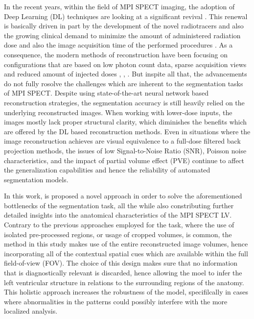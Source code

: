 In the recent years, within the field of MPI SPECT imaging, the adoption of Deep Learning (DL) techniques are looking at a significant revival \cite{tolu2025advancements}. This renewal is basically driven in part by the development of the novel radiotracers and also the growing clinical demand to minimize the amount of administered radiation dose and also the image acquisition time of the performed procedures \cite{henzlova2011future}. As a consequence, the modern methods of reconstruction have been focusing on configurations that are based on low photon count data, sparse acquisition views and reduced amount of injected doses \cite{xie2023transformer}, \cite{xie2024generalizable}, \cite{chen2024dudocfnet}. But inspite all that, the advancements do not fully rosolve the challenges which are inherent to  the segmentation tasks of MPI SPECT. Despite using state-of-the-art neural network based reconstruction strategies, the segmentation accuracy is still heavily relied on the underlying reconstructed images. When working with lower-dose inputs, the images mostly lack proper structural clarity, which diminishes the benefits which are offered by the DL based reconstruction methods. Even in situations where the image reconstruction achieves are visual equivalence to a full-dose filtered back projection methods, the issues of low Signal-to-Noise Ratio (SNR), Poisson noise characteristics, and the impact of partial volume effect (PVE) continue to affect the generalization capabilities and hence the reliability of automated segmentation models.

In this work, is proposed a novel approach in order to solve the aforementioned bottlenecks of the segmentation task, all the while also constributing further detailed insights into the anatomical characteristics of the MPI SPECT LV. Contrary to the previous approaches employed for the task, where the use of isolated pre-processed regions, or usage of cropped volumes, is common, the method in this study makes use of the entire reconstructed image volumes, hence incorporating all of the contextual spatial cues which are available within the full field-of-view (FOV). The choice of this design makes sure that no information that is diagnostically relevant is discarded, hence allowing the moel to infer the left ventricular structure in relations to the surrounding regions of the anatomy. This holistic approach increases the robustness of the model, specifilcally in cases where abnormalities in the patterns could possibly interfere with the more localized analysis.

